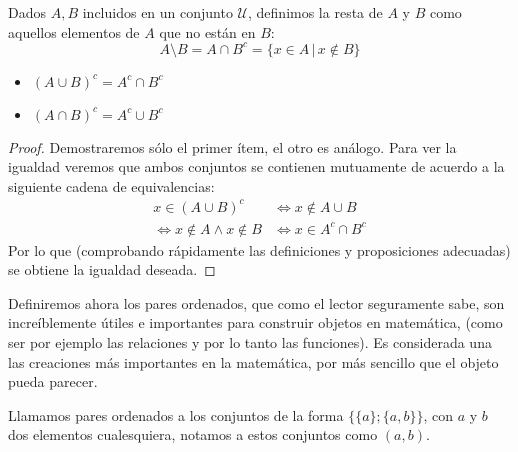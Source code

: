 \documentclass[12pt,a4paper]{book}
\begin{document}
\begin{defi} %
Dados $A,B$ incluidos en un conjunto $\mathcal{U}$, definimos la resta de $A$ y $B$ como aquellos elementos de $A$ que no están en $B$:
$$ A \setminus B = A \cap B^c = \{ x \in A \,\vert\, x \notin B\}$$
\end{defi}

\begin{teo}
\hfill
\begin{itemize}
\item $(A \cup B )^c = A^c \cap B^c$
\item $(A \cap B )^c = A^c \cup B^c$
\end{itemize}
\begin{proof}
Demostraremos sólo el primer ítem, el otro es análogo. Para ver la igualdad veremos que ambos conjuntos se contienen mutuamente de acuerdo a la siguiente cadena de equivalencias:
\begin{align*}
x \in (A \cup B)^c &\Leftrightarrow x \notin A \cup B \\
\Leftrightarrow x \notin A \wedge x \notin B &\Leftrightarrow x \in A^c \cap B^c
\end{align*}
Por lo que (comprobando rápidamente las definiciones y proposiciones adecuadas) se obtiene la igualdad deseada.
\end{proof}
\end{teo}

Definiremos ahora los pares ordenados, que como el lector seguramente sabe, son increíblemente útiles e importantes para construir objetos en matemática, (como ser por ejemplo las relaciones y por lo tanto las funciones). Es considerada una las creaciones más importantes en la matemática, por más sencillo que el objeto pueda parecer.

\begin{defi} %
Llamamos pares ordenados a los conjuntos de la forma $\lbrace \lbrace a \rbrace ; \lbrace a,b \rbrace \rbrace$, con $a$ y $b$ dos elementos cualesquiera, notamos a estos conjuntos como $(a,b)$.
\end{defi}
\end{document}
